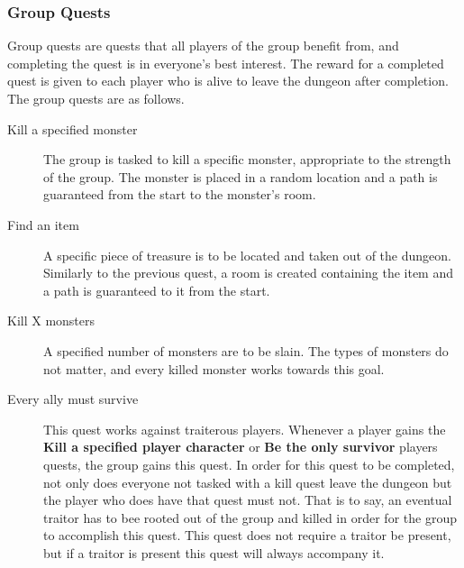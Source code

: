 \documentclass[a4paper]{article}
\begin{document}
\subsubsection{Group Quests}
Group quests are quests that all players of the group benefit from, and completing the quest is in everyone's best interest. The reward for a completed quest is given to each player who 
is alive to leave the dungeon after completion. The group quests are as follows.
\begin{description}
\item[Kill a specified monster] The group is tasked to kill a specific monster, appropriate to the strength of the group. The monster is placed in a random location and a path is 
guaranteed from the start to the monster's room.
\item[Find an item] A specific piece of treasure is to be located and taken out of the dungeon. Similarly to the previous quest, a room is created containing the item and a path is 
guaranteed to it from the start.
\item[Kill X monsters] A specified number of monsters are to be slain. The types of monsters do not matter, and every killed monster works towards this goal.
\item[Every ally must survive] This quest works against traiterous players. Whenever a player gains the \textbf{Kill a specified player character} or \textbf{Be the only survivor} players quests, the group gains this quest.
In order for this quest to be completed, not only does everyone not tasked with a kill quest leave the dungeon but the player who does have that quest must not. That is to say, an eventual  
traitor has to bee rooted out of the group and killed in order for the group to accomplish this quest. This quest does not require a traitor be present, but if a traitor is present this 
quest will always accompany it.
\end{description}
\end{document}
